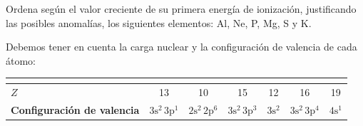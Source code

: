 \begin{question}
    Ordena según el valor creciente de su primera energía
    de ionización, justificando las posibles anomalías, los
    siguientes elementos: Al, Ne, P, Mg, S y K.


    \begin{solu}
        Debemos tener en cuenta la carga nuclear y la configuración
        de valencia de cada átomo:

        \begin{center}
            \begin{tabular}{@{}L{2.9cm} c c c c c c@{}}
                \toprule
                 & \textbf{} & \textbf{} & \textbf{} & \textbf{} & \textbf{} & \textbf{} \\
                \midrule
                \textbf{\(Z\)} & 13 & 10 & 15 & 12 & 16 & 19 \\[3pt]
                \textbf{Configuración de valencia} & \(\mathrm{3s^2\,3p^1}\) & \(\mathrm{2s^2\,2p^6}\) & \(\mathrm{3s^2\,3p^3}\) & \(\mathrm{3s^2}\) & \(\mathrm{3s^2\,3p^4}\) & \(\mathrm{4s^1}\) \\
                \bottomrule
            \end{tabular}
        \end{center}

\end{solu}
\end{question}
